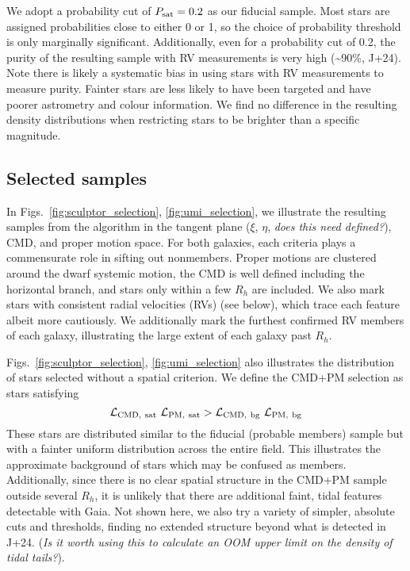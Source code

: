 We adopt a probability cut of \(P_{\rm sat} = 0.2\) as our fiducial
sample. Most stars are assigned probabilities close to either 0 or 1, so
the choice of probability threshold is only marginally significant.
Additionally, even for a probability cut of 0.2, the purity of the
resulting sample with RV measurements is very high (\textasciitilde90\%,
J+24). Note there is likely a systematic bias in using stars with RV
measurements to measure purity. Fainter stars are less likely to have
been targeted and have poorer astrometry and colour information. We find
no difference in the resulting density distributions when restricting
stars to be brighter than a specific magnitude.

\subsection{Selected samples}\label{selected-samples}

In Figs.~\ref{fig:sculptor_selection}, \ref{fig:umi_selection}, we
illustrate the resulting samples from the algorithm in the tangent plane
(\(\xi\), \(\eta\), \emph{does this need defined?}), CMD, and proper
motion space. For both galaxies, each criteria plays a commensurate role
in sifting out nonmembers. Proper motions are clustered around the dwarf
systemic motion, the CMD is well defined including the horizontal
branch, and stars only within a few \(R_h\) are included. We also mark
stars with consistent radial velocities (RVs) (see below), which trace
each feature albeit more cautiously. We additionally mark the furthest
confirmed RV members of each galaxy, illustrating the large extent of
each galaxy past \(R_h\).

Figs.~\ref{fig:sculptor_selection}, \ref{fig:umi_selection} also
illustrates the distribution of stars selected without a spatial
criterion. We define the CMD+PM selection as stars satisfying
\begin{equation}
{\cal L}_{\rm CMD,\ sat}\ {\cal L}_{\rm PM,\ sat} > {\cal L}_{\rm CMD,\ bg}\ {\cal L}_{\rm PM,\ bg}
\end{equation} These stars are distributed similar to the fiducial
(probable members) sample but with a fainter uniform distribution across
the entire field. This illustrates the approximate background of stars
which may be confused as members. Additionally, since there is no clear
spatial structure in the CMD+PM sample outside several \(R_h\), it is
unlikely that there are additional faint, tidal features detectable with
Gaia. Not shown here, we also try a variety of simpler, absolute cuts
and thresholds, finding no extended structure beyond what is detected in
J+24. (\emph{Is it worth using this to calculate an OOM upper limit on
the density of tidal tails?}).

